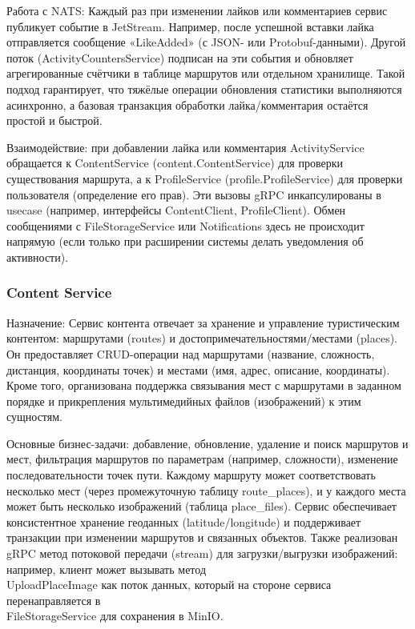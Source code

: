 Работа с NATS: Каждый раз при изменении лайков или комментариев сервис публикует событие в JetStream. Например, после успешной вставки лайка отправляется сообщение «LikeAdded» (с JSON- или Protobuf-данными). Другой поток (ActivityCountersService) подписан на эти события и обновляет агрегированные счётчики в таблице маршрутов или отдельном хранилище. Такой подход гарантирует, что тяжёлые операции обновления статистики выполняются асинхронно, а базовая транзакция обработки лайка/комментария остаётся простой и быстрой. 

Взаимодействие: при добавлении лайка или комментария ActivityService обращается к ContentService (content.ContentService) для проверки существования маршрута, а к ProfileService (profile.ProfileService) для проверки пользователя (определение его прав). Эти вызовы gRPC инкапсулированы в usecase (например, интерфейсы ContentClient, ProfileClient). Обмен сообщениями с FileStorageService или Notifications здесь не происходит напрямую (если только при расширении системы делать уведомления об активности).

\subsubsection*{Content Service}
Назначение: Сервис контента отвечает за хранение и управление туристическим контентом: маршрутами (routes) и достопримечательностями/местами (places). Он предоставляет CRUD-операции над маршрутами (название, сложность, дистанция, координаты точек) и местами (имя, адрес, описание, координаты). Кроме того, организована поддержка связывания мест с маршрутами в заданном порядке и прикрепления мультимедийных файлов (изображений) к этим сущностям.

Основные бизнес-задачи: добавление, обновление, удаление и поиск маршрутов и мест, фильтрация маршрутов по параметрам (например, сложности), изменение последовательности точек пути. Каждому маршруту может соответствовать несколько мест (через промежуточную таблицу route\_places), и у каждого места может быть несколько изображений (таблица place\_files). Сервис обеспечивает консистентное хранение геоданных (latitude/longitude) и поддерживает транзакции при изменении маршрутов и связанных объектов. Также реализован gRPC метод потоковой передачи (stream) для загрузки/выгрузки изображений: например, клиент может вызывать метод \\ UploadPlaceImage как поток данных, который на стороне сервиса перенаправляется в \\ FileStorageService для сохранения в MinIO.

